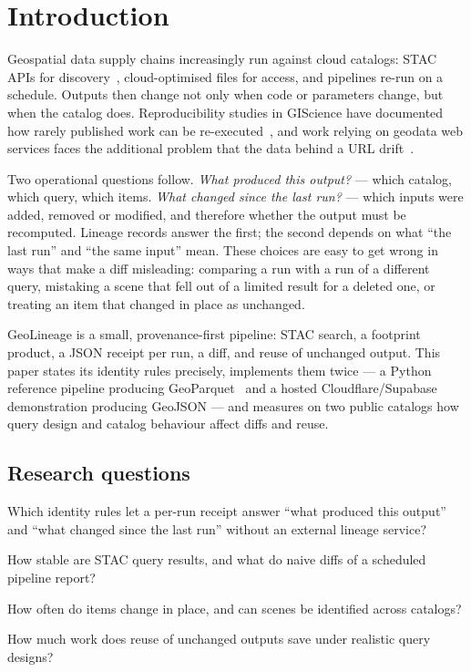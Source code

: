 \documentclass[11pt,a4paper]{article}
\begin{document}
\section{Introduction}

Geospatial data supply chains increasingly run against cloud catalogs: STAC APIs for discovery~\cite{stac}, cloud-optimised files for access, and pipelines re-run on a schedule. Outputs then change not only when code or parameters change, but when the catalog does. Reproducibility studies in GIScience have documented how rarely published work can be re-executed~\cite{nuest2018}, and work relying on geodata web services faces the additional problem that the data behind a URL drift~\cite{cannata2025}.

Two operational questions follow. \emph{What produced this output?} --- which catalog, which query, which items. \emph{What changed since the last run?} --- which inputs were added, removed or modified, and therefore whether the output must be recomputed. Lineage records answer the first; the second depends on what ``the last run'' and ``the same input'' mean. These choices are easy to get wrong in ways that make a diff misleading: comparing a run with a run of a different query, mistaking a scene that fell out of a limited result for a deleted one, or treating an item that changed in place as unchanged.

GeoLineage is a small, provenance-first pipeline: STAC search, a footprint product, a JSON receipt per run, a diff, and reuse of unchanged output. This paper states its identity rules precisely, implements them twice --- a Python reference pipeline producing GeoParquet~\cite{geoparquet} and a hosted Cloudflare/Supabase demonstration producing GeoJSON --- and measures on two public catalogs how query design and catalog behaviour affect diffs and reuse.

\subsection{Research questions}

\begin{description}[leftmargin=2.6em,style=nextline]
  \item[RQ1] Which identity rules let a per-run receipt answer ``what produced this output'' and ``what changed since the last run'' without an external lineage service?
  \item[RQ2] How stable are STAC query results, and what do naive diffs of a scheduled pipeline report?
  \item[RQ3] How often do items change in place, and can scenes be identified across catalogs?
  \item[RQ4] How much work does reuse of unchanged outputs save under realistic query designs?
\end{description}
\end{document}
